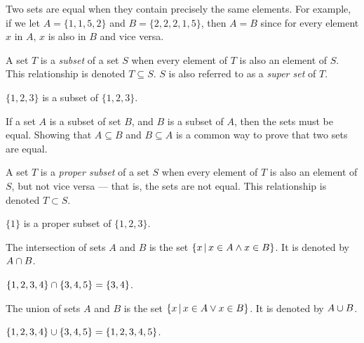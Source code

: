 Two sets are equal when they contain precisely the same elements. For example, if we let $A = \{1, 1, 5, 2\}$ and $B = \{2, 2, 2, 1, 5\}$, then $A = B$ since for every element $x$ in $A$, $x$ is also in $B$ and vice versa.

\begin{defn}\label{subset}
    A set $T$ is a \emph{subset} of a set $S$ when every element of $T$ is also an element of $S$. This relationship is denoted $T \subseteq S$. $S$ is also referred to as a \emph{super set} of $T$.
\end{defn}

\begin{exmp}
    $\{1, 2, 3\}$ is a subset of $\{1, 2, 3\}$.
\end{exmp}

\begin{rmk}
    If a set $A$ is a subset of set $B$, and $B$ is a subset of $A$, then the sets must be equal. Showing that $A \subseteq B$ and $B \subseteq A$ is a common way to prove that two sets are equal.
\end{rmk}

\begin{defn}\label{proper-subset}
    A set $T$ is a \emph{proper subset} of a set $S$ when every element of $T$ is also an element of $S$, but not vice versa --- that is, the sets are not equal. This relationship is denoted $T \subset S$.
\end{defn}

\begin{exmp}
    $\{1\}$ is a proper subset of $\{1, 2, 3\}$.
\end{exmp}

\begin{defn}\label{intersection}
    The intersection of sets $A$ and $B$ is the set $\left\{x \,\middle|\, x \in A \land x \in B \right\}$. It is denoted by $A \cap B$.
\end{defn}

\begin{exmp}
    $\{1, 2, 3, 4\} \cap \{3, 4, 5\} = \{3, 4\}$.
\end{exmp}

\begin{defn}
    The union of sets $A$ and $B$ is the set $\left\{x \,\middle|\, x \in A \lor x \in B\right\}$. It is denoted by $A \cup B$.
\end{defn}

\begin{exmp}
    $\{1, 2, 3, 4\} \cup \{3, 4, 5\} = \{1, 2, 3, 4, 5\}$.
\end{exmp}

